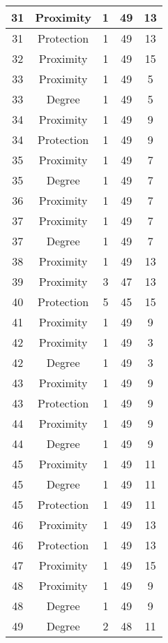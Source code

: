 \documentclass[results.tex]{subfiles}
\begin{document}
\begin{center}
\begin{tabular}{| c || c | c | c | c |}
    \hline
    31 & Proximity & 1 & 49 & 13 \\ 
    \hline
    31 & Protection & 1 & 49 & 13 \\ 
    \hline
    32 & Proximity & 1 & 49 & 15 \\ 
    \hline
    33 & Proximity & 1 & 49 & 5 \\ 
    \hline
    33 & Degree & 1 & 49 & 5 \\ 
    \hline
    34 & Proximity & 1 & 49 & 9 \\ 
    \hline
    34 & Protection & 1 & 49 & 9 \\ 
    \hline
    35 & Proximity & 1 & 49 & 7 \\ 
    \hline
    35 & Degree & 1 & 49 & 7 \\ 
    \hline
    36 & Proximity & 1 & 49 & 7 \\ 
    \hline
    37 & Proximity & 1 & 49 & 7 \\ 
    \hline
    37 & Degree & 1 & 49 & 7 \\ 
    \hline
    38 & Proximity & 1 & 49 & 13 \\ 
    \hline
    39 & Proximity & 3 & 47 & 13 \\ 
    \hline
    40 & Protection & 5 & 45 & 15 \\ 
    \hline
    41 & Proximity & 1 & 49 & 9 \\ 
    \hline
    42 & Proximity & 1 & 49 & 3 \\ 
    \hline
    42 & Degree & 1 & 49 & 3 \\ 
    \hline
    43 & Proximity & 1 & 49 & 9 \\ 
    \hline
    43 & Protection & 1 & 49 & 9 \\ 
    \hline
    44 & Proximity & 1 & 49 & 9 \\ 
    \hline
    44 & Degree & 1 & 49 & 9 \\ 
    \hline
    45 & Proximity & 1 & 49 & 11 \\ 
    \hline
    45 & Degree & 1 & 49 & 11 \\ 
    \hline
    45 & Protection & 1 & 49 & 11 \\ 
    \hline
    46 & Proximity & 1 & 49 & 13 \\ 
    \hline
    46 & Protection & 1 & 49 & 13 \\ 
    \hline
    47 & Proximity & 1 & 49 & 15 \\ 
    \hline
    48 & Proximity & 1 & 49 & 9 \\ 
    \hline
    48 & Degree & 1 & 49 & 9 \\ 
    \hline
    49 & Degree & 2 & 48 & 11 \\ 
    \hline   \end{tabular}
\end{center}
\end{document}
